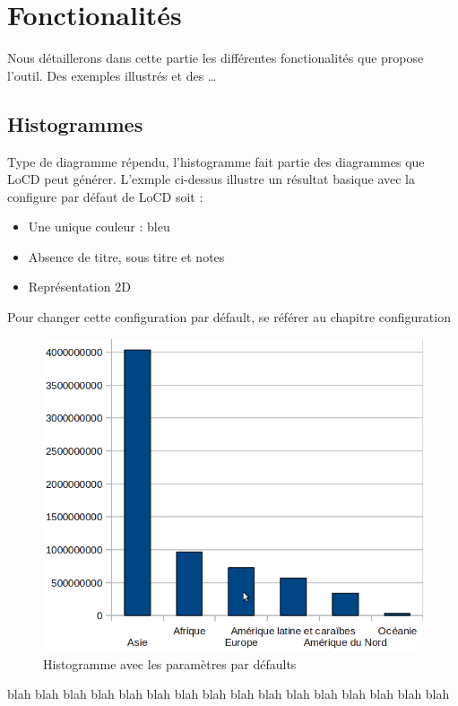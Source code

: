 \chapter{Fonctionalités}
Nous détaillerons dans cette partie les différentes fonctionalités que propose l'outil. Des exemples illustrés et des \dots  
\section{Histogrammes}
Type de diagramme répendu, l'histogramme fait partie des diagrammes que LoCD peut générer. L'exmple ci-dessus illustre un résultat basique avec la configure par défaut de LoCD soit : 
\begin{itemize}
\item
Une unique couleur : bleu
\item
Absence de titre, sous titre et notes
\item
Représentation 2D
\end{itemize}
Pour changer cette configuration par défault, se référer au chapitre configuration%
\begin{figure}[htbp]
\centering
  \includegraphics[scale=0.40]{img/diagrammebaton}
  \caption{Histogramme avec les paramètres par défaults}
  \label{fig:dbatons}
\end{figure}
  blah  blah  blah  blah  blah  blah  blah  blah  blah  blah  blah  blah  blah  blah  blah  blah  
